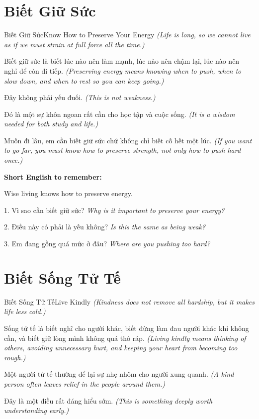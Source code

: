 \section{Biết Giữ Sức}
\begin{truyen}{Biết Giữ Sức}{Know How to Preserve Your Energy}
\textit{(Life is long, so we cannot live as if we must strain at full force all the time.)}

Biết giữ sức là biết lúc nào nên làm mạnh, lúc nào nên chậm lại, lúc nào nên nghỉ để còn đi tiếp.
\textit{(Preserving energy means knowing when to push, when to slow down, and when to rest so you can keep going.)}

Đây không phải yếu đuối.
\textit{(This is not weakness.)}

Đó là một sự khôn ngoan rất cần cho học tập và cuộc sống.
\textit{(It is a wisdom needed for both study and life.)}
\end{truyen}

\begin{baihoc}
Muốn đi lâu, em cần biết giữ sức chứ không chỉ biết cố hết một lúc.
\textit{(If you want to go far, you must know how to preserve strength, not only how to push hard once.)}
\end{baihoc}

\begin{ghinhoanh}
\textbf{Short English to remember:}

Wise living knows how to preserve energy.

\end{ghinhoanh}

\begin{tuhocnhanh}
1. Vì sao cần biết giữ sức? \textit{Why is it important to preserve your energy?}

2. Điều này có phải là yếu không? \textit{Is this the same as being weak?}

3. Em đang gồng quá mức ở đâu? \textit{Where are you pushing too hard?}
\end{tuhocnhanh}
\ngancach

\section{Biết Sống Tử Tế}
\begin{truyen}{Biết Sống Tử Tế}{Live Kindly}
\textit{(Kindness does not remove all hardship, but it makes life less cold.)}

Sống tử tế là biết nghĩ cho người khác, biết đừng làm đau người khác khi không cần, và biết giữ lòng mình không quá thô ráp.
\textit{(Living kindly means thinking of others, avoiding unnecessary hurt, and keeping your heart from becoming too rough.)}

Một người tử tế thường để lại sự nhẹ nhõm cho người xung quanh.
\textit{(A kind person often leaves relief in the people around them.)}

Đây là một điều rất đáng hiểu sớm.
\textit{(This is something deeply worth understanding early.)}
\end{truyen}

